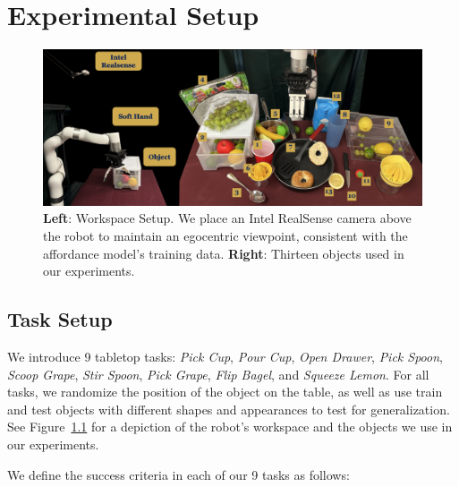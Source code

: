 \chapter{Experimental Setup}
\label{sec:setup}

\begin{figure}[H]
\centering
\includegraphics[width=\linewidth]{figs/workspace.pdf}
\vspace{-0.2in}
  \caption{\small \textbf{Left}: Workspace Setup. We place an Intel RealSense camera above the robot to maintain an egocentric viewpoint, consistent with the affordance model's training data. \textbf{Right}: Thirteen objects used in our experiments.}
 \label{fig:workspace}
 \vspace{-0.15in}
\end{figure}

\section{Task Setup} We introduce 9 tabletop tasks: \textit{Pick Cup}, \textit{Pour Cup}, \textit{Open Drawer}, \textit{Pick Spoon}, \textit{Scoop Grape}, \textit{Stir Spoon}, \textit{Pick Grape}, \textit{Flip Bagel}, and \textit{Squeeze Lemon}. For all tasks, we randomize the position of the object on the table, as well as use train and test objects with different shapes and appearances to test for generalization. See Figure~\ref{fig:workspace} for a depiction of the robot's workspace and the objects we use in our experiments.

We define the success criteria in each of our 9 tasks as follows:

